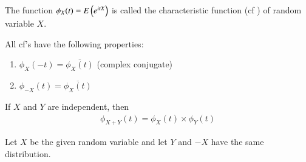 

    \begin{definition}
    The function $\phi_X(t) = E\left(e^{itX}\right)$ is called the characteristic function (cf ) of random variable $X$.
    \label{transform/1/def:characterstic_function}
   \end{definition}
   \begin{proposition}
   All cf’s have the following properties:\\
   \begin{enumerate}
       \item $\phi_X(-t) =\overline{\phi_X(t)}$ (complex conjugate)
       \item  $\phi_{-X}(t) = \overline{\phi_X(t)}$  
   \end{enumerate}
   \label{transform/1/prop:properties_of_cf}
   \end{proposition}
   \begin{proposition}
    If $X$ and $Y$ are independent, then
    \begin{align}
        \phi_{X+Y}(t) = \phi_X(t)\times\phi_Y(t)
    \end{align}
    \label{transform/1/prop:Sum_of_independent_cvs}
   \end{proposition}
   Let $X$ be the given random variable and let $Y$  and $-X$ have the same distribution.
